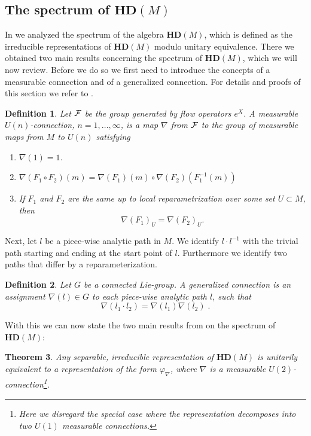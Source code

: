 \documentclass[12pt]{article}
\def\cf{{\cal F}}
\newtheorem{thm}{Theorem}[subsection]
\newtheorem{definition}[thm]{Definition}
\newcommand{\cF}{{\cal F}}
\begin{document}
\subsection{The spectrum of $\mathbf{HD}(M) $}

In \cite{AGnew} we analyzed the spectrum of the algebra $\mathbf{HD}(M) $, which is defined as 
 the irreducible representations of $\mathbf{HD}(M) $ modulo unitary equivalence. There we obtained two main results concerning the spectrum of $\mathbf{HD}(M) $, which we will now review. Before we do so we first need to introduce the concepts of a measurable connection and of a generalized connection. For details and proofs of this section we refer to \cite{AGnew}.


\begin{definition}
Let $\cf$ be the group generated by flow operators $e^X$. A measurable $U(n)$-connection, $n=1,\ldots , \infty$, is a map $\nabla$ from $\cF$ to the group of measurable maps from $M$ to $U(n)$ satisfying
\begin{enumerate}
\item $\nabla (1)= 1$.
\item $\nabla (F_1 \circ F_2)(m)=\nabla (F_1) (m) \circ \nabla (F_2)(F_1^{-1}(m))$
\item If $F_1$ and $F_2$ are the same up to local reparametrization over some set $U\subset M$, then 
$$ \nabla ( F_1)_U= \nabla (F_2)_U  . $$ 
\end{enumerate} 
\end{definition}



Next, let $l$ be a piece-wise analytic path in $M$. We identify $l\cdot l^{-1}$ with the trivial path starting and ending at the start point of $l$. Furthermore we identify two paths that differ by a reparameterization. 
\begin{definition}
Let $G$ be a connected Lie-group. A generalized connection is an assignment $\nabla(l)\in G$ to each piece-wise analytic path $l$, such that
$$
\nabla(l_1\cdot l_2) = \nabla(l_1)\nabla(l_2)\;.
$$
\end{definition}


With this we can now state the two main results from \cite{AGnew}  on the spectrum of $\mathbf{HD}(M) $:
\begin{thm}
\label{TH1}
Any separable, irreducible representation of $\mathbf{HD}(M) $ is unitarily equivalent to a representation of the form $\varphi_\nabla$, where $\nabla$ is a measurable $U(2)$-connection\footnote{Here we disregard the special case where the representation decomposes into two $U(1)$ measurable connections.}.
\end{thm}
\end{document}

